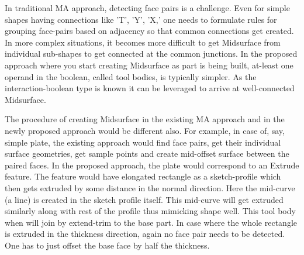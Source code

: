 
In traditional MA approach, detecting face pairs is a challenge. Even for simple shapes having connections like ’T’, 'Y', ’X,’ one needs to formulate rules for grouping face-pairs based on adjacency so that common connections get created. In more complex situations, it becomes more difficult to get Midsurface from individual sub-shapes to get connected at the common junctions. In the proposed approach where you start creating Midsurface as part is being built, at-least one operand in the boolean, called tool bodies, is typically simpler. As the interaction-boolean type is known it can be leveraged to arrive at well-connected Midsurface. 

The procedure of creating Midsurface in the existing MA approach and in the newly proposed approach would be different also. For example, in case of, say, simple plate, the existing approach would find face pairs, get their individual surface geometries, get sample points and create mid-offset surface between the paired faces. In the proposed approach, the plate would correspond to an Extrude feature. The feature would have elongated rectangle as a sketch-profile which then gets extruded by some distance in the normal direction. Here the mid-curve (a line) is created in the sketch profile itself. This mid-curve will get extruded similarly along with rest of the profile thus mimicking shape well. This tool body when will join by extend-trim to the base part. In case where the whole rectangle is extruded in the thickness direction, again no face pair needs to be detected. One has to just offset the base face by half the thickness.


